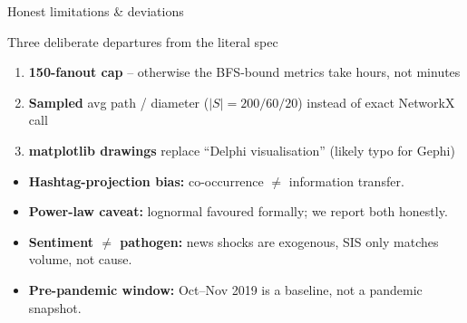 \documentclass[aspectratio=169,10pt]{beamer}
\begin{document}
\begin{frame}{Honest limitations \& deviations}
  \begin{block}{Three deliberate departures from the literal spec}
    \begin{enumerate}\itemsep2pt
      \item[1.] \textbf{150-fanout cap} -- otherwise the
            BFS-bound metrics take hours, not minutes
      \item[2.] \textbf{Sampled} avg path / diameter
            (\(|S|=200/60/20\)) instead of exact NetworkX call
      \item[3.] \textbf{matplotlib drawings} replace
            ``Delphi visualisation'' (likely typo for Gephi)
    \end{enumerate}
  \end{block}
  \vfill
  \begin{itemize}\itemsep2pt
    \item \textbf{Hashtag-projection bias:} co-occurrence
          \(\neq\) information transfer.
    \item \textbf{Power-law caveat:} lognormal favoured
          formally; we report both honestly.
    \item \textbf{Sentiment \(\neq\) pathogen:} news shocks
          are exogenous, SIS only matches volume, not cause.
    \item \textbf{Pre-pandemic window:} Oct--Nov 2019 is a
          baseline, not a pandemic snapshot.
  \end{itemize}
\end{frame}
\end{document}

